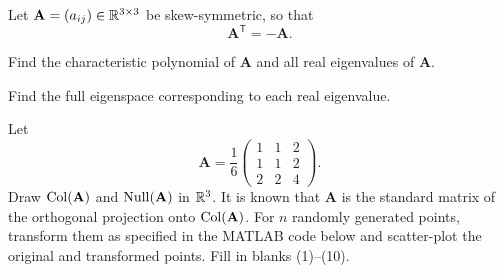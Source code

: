 \begin{problem}
Let $\mathbf A=(a_{ij})\in\mathbb{R}^{3\times3}$ be skew-symmetric, so that
\[
\mathbf A^{\mathsf T}=-\mathbf A.
\]
\begin{problemsubparts}
\item Find the characteristic polynomial of $\mathbf A$ and all real eigenvalues of $\mathbf A$.
\item Find the full eigenspace corresponding to each real eigenvalue.
\end{problemsubparts}
\end{problem}

\begin{problem}
Let
\[
\mathbf A=\frac16
\begin{pmatrix}
1&1&2\\
1&1&2\\
2&2&4
\end{pmatrix}.
\]
Draw $\operatorname{Col}(\mathbf A)$ and $\operatorname{Null}(\mathbf A)$ in $\mathbb{R}^3$. It is known that $\mathbf A$ is the standard matrix of the orthogonal projection onto $\operatorname{Col}(\mathbf A)$. For $n$ randomly generated points, transform them as specified in the MATLAB code below and scatter-plot the original and transformed points. Fill in blanks \textup{(1)}--\textup{(10)}.


\end{problem}
